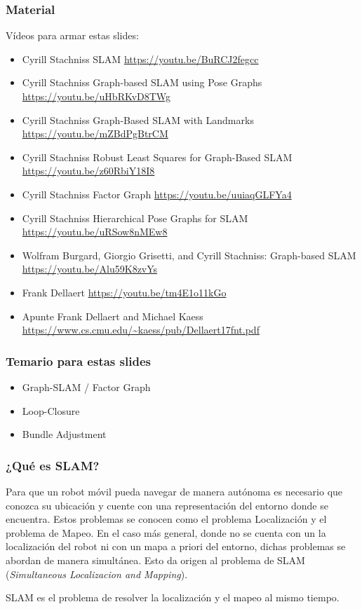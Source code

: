 \begin{frame}
	\frametitle{Material}
	
	Vídeos para armar estas slides:
	\begin{itemize}
		\item Cyrill Stachniss SLAM \url{https://youtu.be/BuRCJ2fegcc}
		\item Cyrill Stachniss Graph-based SLAM using Pose Graphs \url{https://youtu.be/uHbRKvD8TWg}
		\item Cyrill Stachniss Graph-Based SLAM with Landmarks \url{https://youtu.be/mZBdPgBtrCM}
		\item Cyrill Stachniss Robust Least Squares for Graph-Based SLAM \url{https://youtu.be/z60RbiY18I8}
		\item Cyrill Stachniss Factor Graph \url{https://youtu.be/uuiaqGLFYa4}
		\item Cyrill Stachniss Hierarchical Pose Graphs for SLAM \url{https://youtu.be/uRSow8nMEw8}
		\item Wolfram Burgard, Giorgio Grisetti, and Cyrill Stachniss: Graph-based SLAM \url{https://youtu.be/Alu59K8zvYs}
		\item Frank Dellaert \url{https://youtu.be/tm4E1o11kGo}
        \item Apunte Frank Dellaert and Michael Kaess \url{https://www.cs.cmu.edu/~kaess/pub/Dellaert17fnt.pdf}
	\end{itemize}
	
\end{frame}

\begin{frame}
	\frametitle{Temario para estas slides}
	
	\begin{itemize}
		\item Graph-SLAM / Factor Graph
		\item Loop-Closure
		\item Bundle Adjustment
	\end{itemize}
	
\end{frame}

\begin{frame}
	\frametitle{¿Qué es SLAM?}
	
	Para que un robot móvil pueda navegar de manera autónoma es necesario que conozca su ubicación y cuente con una representación del entorno donde se encuentra. Estos problemas se conocen como el problema Localización y el problema de Mapeo. En el caso más general, donde no se cuenta con un la localización del robot ni con un mapa a priori del entorno, dichas problemas se abordan de manera simultánea. Esto da origen al problema de SLAM (\emph{Simultaneous Localizacion and Mapping}).
	\begin{block}{}
		SLAM es el problema de resolver la localización y el mapeo al mismo tiempo.
	\end{block}
	
\end{frame}


